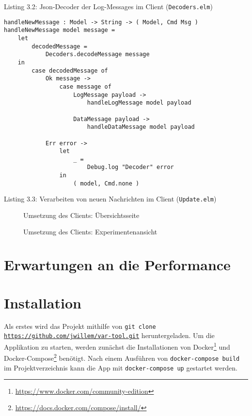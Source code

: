 \begin{center}
  Listing 3.2: Json-Decoder der Log-Messages im Client (\texttt{Decoders.elm})
\end{center}
\clearpage
\begin{verbatim}
handleNewMessage : Model -> String -> ( Model, Cmd Msg )
handleNewMessage model message =
    let
        decodedMessage =
            Decoders.decodeMessage message
    in
        case decodedMessage of
            Ok message ->
                case message of
                    LogMessage payload ->
                        handleLogMessage model payload

                    DataMessage payload ->
                        handleDataMessage model payload

            Err error ->
                let
                    _ =
                        Debug.log "Decoder" error
                in
                    ( model, Cmd.none )
\end{verbatim}
\begin{center}
  Listing 3.3: Verarbeiten von neuen Nachrichten im Client (\texttt{Update.elm})
\end{center}

\begin{landscape}
  \begin{figure}[h]
    \centering
    \par
    \caption{Umsetzung des Clients: Übersichtsseite}
    \label{fig:dev-view-1}
  \end{figure}
  \begin{figure}[h]
    \centering
    \par
    \caption{Umsetzung des Clients: Experimentenansicht}
    \label{fig:dev-view-2}
  \end{figure}
\end{landscape}
\section{Erwartungen an die Performance}
\section{Installation}
Als erstes wird das Projekt mithilfe von \texttt{git clone \url{https://github.com/jwillem/var-tool.git}} heruntergeladen.
Um die Applikation zu starten, werden zunächst die Installationen von Docker\footnote{\url{https://www.docker.com/community-edition}} und Docker-Compose\footnote{\url{https://docs.docker.com/compose/install/}} benötigt.
Nach einem Ausführen von \texttt{docker-compose build} im Projektverzeichnis kann die App mit \texttt{docker-compose up} gestartet werden.
